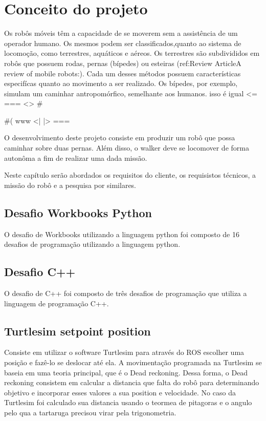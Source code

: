 \chapter{Conceito do projeto}
\label{chap:fundteor}
Os robôs móveis têm a capacidade de se moverem sem a assistência de um 
operador humano. Os mesmos podem ser classificados,quanto ao sistema de 
locomoção, como terrestres, aquáticos e aéreos. Os terrestres são subdivididos 
em robôs que possuem rodas, pernas (bípedes) ou esteiras (ref:Review ArticleA 
review of mobile robots:). Cada um desses métodos possuem características especifícas 
quanto ao movimento a ser realizado. Os bípedes, por exemplo, simulam um caminhar 
antropomórfico, semelhante aos humanos.
isso é igual <=  === <> #{ #( www
<| |>
===



O desenvolvimento deste projeto consiste em produzir um robô que possa caminhar 
sobre duas pernas. Além disso, o walker deve se locomover de forma autonôma a fim 
de realizar uma dada missão.

Neste capítulo serão abordados os requisitos do cliente, os requisistos técnicos, 
a missão do robô e a pesquisa por similares. 


\section{Desafio Workbooks Python}

O desafio de Workbooks utilizando a linguagem python foi composto de 16 desafios de 
programação utilizando a linguagem python.

\section{Desafio C++}
O desafio de C++ foi composto de três desafios de programação que utiliza a linguagem 
de programação C++.

\section{Turtlesim setpoint position}
Consiste em utilizar o software Turtlesim para através do ROS escolher 
uma posição e fazê-lo se deslocar até ela. A movimentação programada na 
Turtlesim se baseia em uma teoria principal, que é o
Dead reckoning. Dessa forma, o Dead reckoning consistem em calcular a 
distancia que falta do robô para determinando objetivo e incorporar esses
valores a sua position e velocidade. No caso da Turtlesim foi calculado
sua distancia usando o teormea de pitagoras e o angulo pelo qua a tartaruga
precisou virar pela trigonometria.

}
